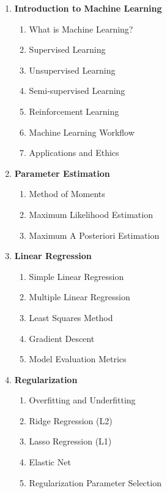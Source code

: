 \documentclass[a4paper,10pt]{article}
\begin{document}
\begin{enumerate}[label=\Roman*.]
    \item \textbf{Introduction to Machine Learning}
    \begin{enumerate}[label=\alph*.]
        \item What is Machine Learning?
        \item Supervised Learning
        \item Unsupervised Learning
        \item Semi-supervised Learning
        \item Reinforcement Learning
        \item Machine Learning Workflow
        \item Applications and Ethics
    \end{enumerate}

    \item \textbf{Parameter Estimation}
    \begin{enumerate}[label=\alph*.]
        \item Method of Moments
        \item Maximum Likelihood Estimation
        \item Maximum A Posteriori Estimation
    \end{enumerate}

    \item \textbf{Linear Regression}
    \begin{enumerate}[label=\alph*.]
        \item Simple Linear Regression
        \item Multiple Linear Regression
        \item Least Squares Method
        \item Gradient Descent
        \item Model Evaluation Metrics
    \end{enumerate}

    \item \textbf{Regularization}
    \begin{enumerate}[label=\alph*.]
        \item Overfitting and Underfitting
        \item Ridge Regression (L2)
        \item Lasso Regression (L1)
        \item Elastic Net
        \item Regularization Parameter Selection
    \end{enumerate}


\end{enumerate}
\end{document}
